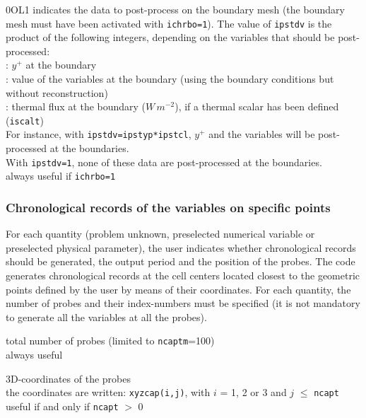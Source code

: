 {0}{O}{L1}
{indicates the data to post-process on the boundary mesh (the boundary mesh must
have been activated with {\tt ichrbo=1}).%
 The value of {\tt ipstdv} is
the product of the following integers, depending on the variables that should be
post-processed:\\
\hspace*{1.3cm}{\tt ipstyp}: $y^+$ at the boundary\\
\hspace*{1.3cm}{\tt ipstcl}: value of the variables at the
boundary (using the boundary conditions but without reconstruction)\\
\hspace*{1.3cm}{\tt ipstft}: thermal flux at the boundary
($W\,m^{-2}$), if a thermal scalar has been defined ({\tt iscalt})\\
For instance, with {\tt ipstdv=ipstyp*ipstcl}, $y^+$ and the variables will be
post-processed at the boundaries.\\
With {\tt ipstdv=1}, none of these data are post-processed at the boundaries.\\
always useful if {\tt ichrbo=1}}

\subsubsection{Chronological records of the variables on specific points}

For each quantity (problem unknown, preselected numerical variable or
preselected physical parameter), the user indicates whether chronological records
should be generated, the output period and the position of the
probes. The code generates chronological records at the cell centers located
closest to the geometric points defined by the user by means of their
coordinates. For each quantity, the number of probes and their
index-numbers must be specified (it is not mandatory to generate all
the variables at all the probes).


{total number of probes (limited to {\tt ncaptm}=100)\\
always useful }

{3D-coordinates of the probes\\
the coordinates are written: {\tt xyzcap(i,j)}, with $i$ = 1, 2 or 3 and $j$
$\leqslant$ {\tt ncapt}\\
useful if and only if {\tt ncapt} $>$ 0}

